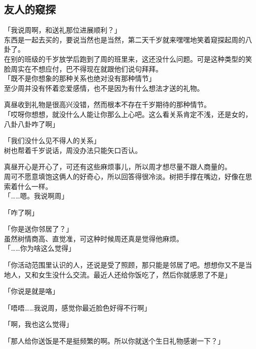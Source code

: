 \subsection{友人的窥探}

「我说周啊，和送礼那位进展顺利？」\\

东西是一起去买的，要说当然也是当然，第二天千岁就来嘿嘿地笑着窥探起周的八卦了。\\

在别的班级的千岁放学后跑到了周的班里来，这还没什么问题。可是这种类型的笑脸周实在不想应付，巴不得现在就跟他们说句拜拜。\\

「既不是你想象的那种关系也绝对没有那种情节」\\

至少周并没有怀着恋爱感情，也不是因为有什么想法才送的礼物。

真昼收到礼物是很高兴没错，然而根本不存在千岁期待的那种情节。\\

「哎呀你想想，就没什么人能让你那么上心吧。这么看关系肯定不浅，还是女的，八卦八卦咋了啊」

「我们没什么见不得人的关系」\\

树也帮着千岁说话，周没办法只能矢口否认。

真昼开心是开心了，可还有这些麻烦事儿，所以周才想尽量不跟人商量的。\\

周可不愿意填饱这俩人的好奇心，所以回答得很冷淡。树把手撑在嘴边，好像在思索着什么一样。\\

「……嗯。我说啊周」

「咋了啊」

「你是送你邻居了？」\\

虽然树情商高、直觉准，可这种时候周还真是觉得他麻烦。\\

「……你为啥这么觉得」

「你活动范围里认识的人，还说是受了照顾，那只能是邻居了吧。想想你又不是当地人，又和女生没什么交流。最近人还给你饭吃了，然后你就感恩了不是」

「你说是就是咯」

「唔唔……我说周，感觉你最近脸色好得不行啊」

「啊，我也这么觉得」

「那人给你送饭是不是挺频繁的啊。所以你就送个生日礼物感谢一下？」\\

